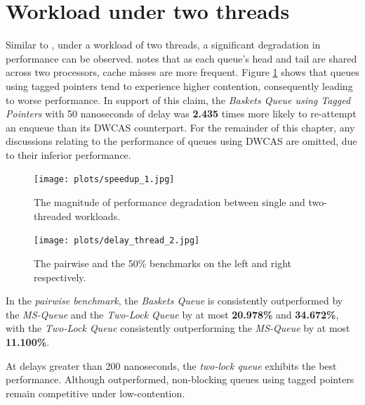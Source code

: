 \section{Workload under two threads}
Similar to \citep{michael1996simple,hoffman2007baskets,ladan2008optimistic},
under a workload of two threads, a significant degradation in performance can
be observed. \citeauthor{michael1996simple} notes that as each queue's head and
tail are shared across two processors, cache misses are more frequent. 
Figure \ref{fig:perf_deg_1_thread} shows that queues using tagged pointers tend
to experience higher contention, consequently leading to worse performance. 
In support of this claim, the \emph{Baskets Queue using Tagged Pointers} with
50 nanoseconds of delay was \textbf{2.435} times more likely to re-attempt an
enqueue than its DWCAS counterpart. For the remainder of this chapter, any
discussions relating to the performance of queues
using DWCAS are omitted, due to their inferior performance.

\begin{figure}[!ht]
    \centering
    \texttt{[image: plots/speedup\_1.jpg]}
    \caption{The magnitude of performance degradation between single and two-threaded workloads.}
    \label{fig:perf_deg_1_thread}
\end{figure}

\begin{figure}[!ht]
    \centering
    \texttt{[image: plots/delay\_thread\_2.jpg]}
    \caption{The pairwise and the 50\% benchmarks on the left and right respectively.}
    \label{fig:perf_2_thread}
\end{figure}

In the \emph{pairwise benchmark}, the \emph{Baskets Queue} is consistently
outperformed by the \emph{MS-Queue} and the \emph{Two-Lock Queue} by at most
\textbf{20.978\%} and \textbf{34.672\%}, with the \emph{Two-Lock Queue}
consistently outperforming the \emph{MS-Queue} by at most \textbf{11.100\%}.

At delays greater than 200 nanoseconds, the \emph{two-lock queue} exhibits the
best performance.
Although outperformed, non-blocking queues using tagged pointers remain
competitive under low-contention. 

